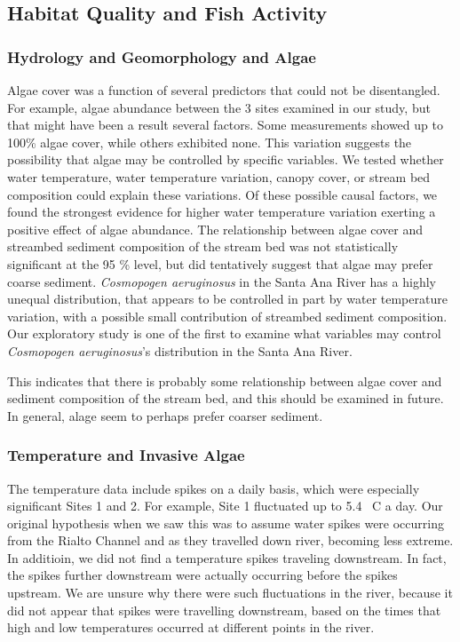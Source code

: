 \documentclass{article}\usepackage[]{graphicx}\usepackage[]{color}
\begin{document}
\subsection{Habitat Quality and Fish Activity}

\subsubsection{Hydrology and Geomorphology and Algae}

Algae cover was a function of several predictors that could not be disentangled. For example, algae abundance between the 3 sites examined in our study, but that might have been a result several factors. Some measurements showed up to 100\% algae cover, while others exhibited none. This variation suggests the possibility that algae may be controlled by specific variables. We tested whether water temperature, water temperature variation, canopy cover, or stream bed composition could explain these variations. Of these possible causal factors, we found the strongest evidence for higher water temperature variation exerting a positive effect of algae abundance. The relationship between algae cover and streambed sediment composition of the stream bed was not statistically significant at the 95 \% level, but did tentatively suggest that algae may prefer coarse sediment. \emph{Cosmopogen aeruginosus} in the Santa Ana River has a highly unequal distribution, that appears to be controlled in part by water temperature variation, with a possible small contribution of streambed sediment composition. 
Our exploratory study is one of the first to examine what variables may control \emph{Cosmopogen aeruginosus}'s distribution in the Santa Ana River. 

This indicates that there is probably some relationship between algae cover and sediment composition of the stream bed, and this should be examined in future. In general, alage seem to perhaps prefer coarser sediment. 

\subsubsection{Temperature and Invasive Algae}

The temperature data include spikes on a daily basis, which were especially significant Sites 1 and 2. For example, Site 1 fluctuated up to 5.4 \textdegree~C a day. Our original hypothesis when we saw this was to assume water spikes were occurring from the Rialto Channel and as they travelled down river, becoming less extreme. In additioin, we did not find a temperature spikes traveling downstream. In fact, the spikes further downstream were actually occurring before the spikes upstream. We are unsure why there were such fluctuations in the river, because it did not appear that spikes were travelling downstream, based on the times that high and low temperatures occurred at different points in the river. 
\end{document}
